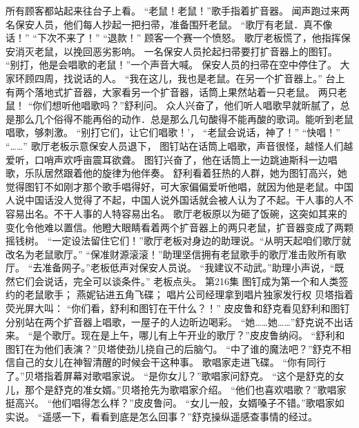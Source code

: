 \documentclass[a4paper,12pt,UTF8,twoside]{ctexbook}
\begin{document}
        所有顾客都站起来往台子上看。 
        “老鼠！老鼠！”歌手指着扩音器。 
        闻声跑过来两名保安人员，他们每人抄起一把扫帚，准备围歼老鼠。 
        “歌厅有老鼠．真不像话！” 
        “下次不来了！” 
        “退款！” 
        顾客一个赛一个愤怒。 
        歌厅老板慌了，他指挥保安消灭老鼠，以挽回恶劣影响。 
        一名保安人员抡起扫帚要打扩音器上的图钉。 
        “别打，他是会唱歌的老鼠！”一个声音大喊。 
        保安人员的扫帚在空中停住了。 
        大家环顾四周，找说话的人。 
        “我在这儿，我也是老鼠。在另一个扩音器上。” 
        台上有两个落地式扩音器，大家看另一个扩音器，话筒上果然站着一只老鼠。 
        两只老鼠！ 
        “你们想听他唱歌吗？”舒利问。 
        众人兴奋了，他们听人唱歌早就昕腻了，总是那么几个俗得不能再俗的动作．总是那么几句酸得不能再酸的歌词。能听到老鼠唱歌，够刺激。 
        “别打它们，让它们唱歌！'， 
        “老鼠会说话，神了！” 
        “快唱！” 
        “……” 
        歌厅老板示意保安人员退下， 
        图钉站在话筒上唱歌，声音很怪，越怪人们越爱听，口哨声欢呼亩震耳欲聋。 
        图钉兴奋了，他在话筒上一边跳迪斯科一边唱歌，乐队居然跟着他的旋律为他伴奏。 
        舒利看着狂热的人群，她为图钉高兴，她觉得图钉不如刚才那个歌手唱得好，可大家偏偏爱听他唱，就因为他是老鼠。中国人说中国话没人觉得了不起，中国人说外国话就会被人认为了不起。干人事的人不容易出名。不干人事的人特容易出名。 
        歌厅老板原以为砸了饭碗，这突如其来的变化令他难以置信。他瞪大眼睛看着两个扩音器上的两只老鼠，扩音器变成了两颗摇钱树。 
        “一定设法留住它们！”歌厅老板对身边的助理说。“从明天起咱们歌厅就改名为老鼠歌厅。” 
        “保准财源滚滚！”助理坚信拥有老鼠歌手的歌厅准击败所有歌厅。 
        “去准备网子。”老板低声对保安人员说。 
        “我建议不动武。”助理小声说，“既然它们会说话，完全可以谈条件。” 
        老板点头。   第216集 
        图钉成为第一个和人类签约的老鼠歌手； 
        燕妮钻进五角飞碟； 
        唱片公司经理拿到唱片独家发行权   
        贝塔指着荧光屏大叫： 
        “你们看，舒利和图钉在干什么？！” 
        皮皮鲁和舒克看见舒利和图钉分别站在两个扩音器上唱歌，一屋子的人边昕边喝彩。 
        “她……她……”舒克说不出话来。 
        “是个歌厅。现在是上午，哪儿有上午开业的歌厅？”皮皮鲁纳闷。 
        “舒利和图钉在为他们表演？”贝塔使劲儿挠自己的后脑勺。 
        “中了谁的魔法吧？”舒克不相信自己的女儿在神智清醒的时候会干这种事。 
        歌唱家走进飞碟。 
        “你有同行了。”贝塔指着屏幕对歌唱家说。 
        “是你女儿？”歌唱家问舒克。 
        “这个是舒克的女儿，那个是舒克的准女婿。”贝塔抢先为歌唱家介绍。 
        “他们也喜欢唱歌？”歌唱家挺高兴。 
        “他们唱得怎么样？”皮皮鲁问。 
        “女儿一般，女婿嗓子不错。”歌唱家如实说。 
        “遥感一下，看看到底是怎么回事？”舒克操纵遥感查事情的经过。 
\end{document}
